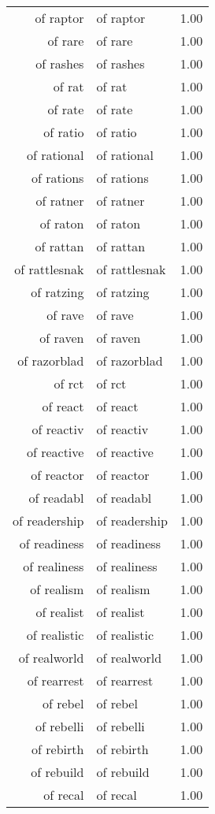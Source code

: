 \begin{table}[ht]
\begin{tabular}{rlr}
  of raptor & of raptor & 1.00 \\ 
  of rare & of rare & 1.00 \\ 
  of rashes & of rashes & 1.00 \\ 
  of rat & of rat & 1.00 \\ 
  of rate & of rate & 1.00 \\ 
  of ratio & of ratio & 1.00 \\ 
  of rational & of rational & 1.00 \\ 
  of rations & of rations & 1.00 \\ 
  of ratner & of ratner & 1.00 \\ 
  of raton & of raton & 1.00 \\ 
  of rattan & of rattan & 1.00 \\ 
  of rattlesnak & of rattlesnak & 1.00 \\ 
  of ratzing & of ratzing & 1.00 \\ 
  of rave & of rave & 1.00 \\ 
  of raven & of raven & 1.00 \\ 
  of razorblad & of razorblad & 1.00 \\ 
  of rct & of rct & 1.00 \\ 
  of react & of react & 1.00 \\ 
  of reactiv & of reactiv & 1.00 \\ 
  of reactive & of reactive & 1.00 \\ 
  of reactor & of reactor & 1.00 \\ 
  of readabl & of readabl & 1.00 \\ 
  of readership & of readership & 1.00 \\ 
  of readiness & of readiness & 1.00 \\ 
  of realiness & of realiness & 1.00 \\ 
  of realism & of realism & 1.00 \\ 
  of realist & of realist & 1.00 \\ 
  of realistic & of realistic & 1.00 \\ 
  of realworld & of realworld & 1.00 \\ 
  of rearrest & of rearrest & 1.00 \\ 
  of rebel & of rebel & 1.00 \\ 
  of rebelli & of rebelli & 1.00 \\ 
  of rebirth & of rebirth & 1.00 \\ 
  of rebuild & of rebuild & 1.00 \\ 
  of recal & of recal & 1.00 \\ 

\end{tabular}
\end{table}
